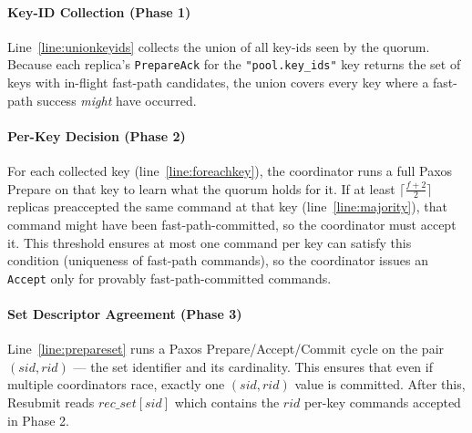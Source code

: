 \documentclass[twocolumn]{article}
\begin{document}
\paragraph{Key-ID Collection (Phase 1)}
Line~\ref{line:unionkeyids} collects the union of all key-ids seen by the quorum. Because each replica's \texttt{PrepareAck} for the \texttt{"pool.key\_ids"} key returns the set of keys with in-flight fast-path candidates, the union covers every key where a fast-path success \emph{might} have occurred.

\paragraph{Per-Key Decision (Phase 2)}
For each collected key (line~\ref{line:foreachkey}), the coordinator runs a full Paxos Prepare on that key to learn what the quorum holds for it. If at least $\lceil\frac{f+2}{2}\rceil$ replicas preaccepted the same command at that key (line~\ref{line:majority}), that command might have been fast-path-committed, so the coordinator must accept it. This threshold ensures at most one command per key can satisfy this condition (uniqueness of fast-path commands), so the coordinator issues an \texttt{Accept} only for provably fast-path-committed commands.

\paragraph{Set Descriptor Agreement (Phase 3)}
Line~\ref{line:prepareset} runs a Paxos Prepare/Accept/Commit cycle on the pair $(sid, rid)$ — the set identifier and its cardinality. This ensures that even if multiple coordinators race, exactly one $(sid, rid)$ value is committed. After this, Resubmit reads $rec\_set[sid]$ which contains the $rid$ per-key commands accepted in Phase 2.
\end{document}
